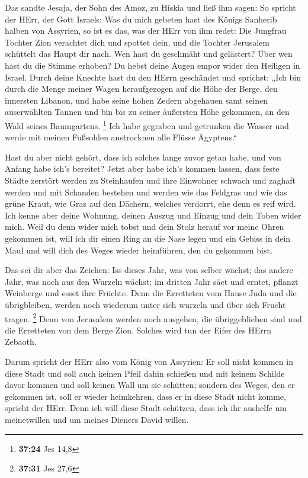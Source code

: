  Das sandte Jesaja, der Sohn des Amoz, zu Hiskia und ließ
ihm sagen: So spricht der HErr, der Gott Israels: Was du mich gebeten
hast des Königs Sanherib halben von Assyrien,  so ist es
das, was der HErr von ihm redet: Die Jungfrau Tochter Zion verachtet
dich und spottet dein, und die Tochter Jerusalem schüttelt das Haupt dir
nach.  Wen hast du geschmäht und gelästert? Über wen hast
du die Stimme erhoben? Du hebst deine Augen empor wider den Heiligen in
Israel.  Durch deine Knechte hast du den HErrn geschändet
und sprichst: „Ich bin durch die Menge meiner Wagen heraufgezogen auf
die Höhe der Berge, den innersten Libanon, und habe seine hohen Zedern
abgehauen samt seinen auserwählten Tannen und bin bis zu seiner
äußersten Höhe gekommen, an den Wald seines Baumgartens. \footnote{\textbf{37:24}
  Jes 14,8}  Ich habe gegraben und getrunken die Wasser und
werde mit meinen Fußsohlen austrocknen alle Flüsse Ägyptens.``

 Hast du aber nicht gehört, dass ich solches lange zuvor
getan habe, und von Anfang habe ich's bereitet? Jetzt aber habe ich's
kommen lassen, dass feste Städte zerstört werden zu Steinhaufen
 und ihre Einwohner schwach und zaghaft werden und mit
Schanden bestehen und werden wie das Feldgras und wie das grüne Kraut,
wie Gras auf den Dächern, welches verdorrt, ehe denn es reif wird.
 Ich kenne aber deine Wohnung, deinen Auszug und Einzug und
dein Toben wider mich.  Weil du denn wider mich tobst und
dein Stolz herauf vor meine Ohren gekommen ist, will ich dir einen Ring
an die Nase legen und ein Gebiss in dein Maul und will dich des Weges
wieder heimführen, den du gekommen bist.

 Das sei dir aber das Zeichen: Iss dieses Jahr, was von
selber wächst; das andere Jahr, was noch aus den Wurzeln wächst; im
dritten Jahr säet und erntet, pflanzt Weinberge und esset ihre Früchte.
 Denn die Erretteten vom Hause Juda und die übrigbleiben,
werden noch wiederum unter sich wurzeln und über sich Frucht tragen.
\footnote{\textbf{37:31} Jes 27,6}  Denn von Jerusalem
werden noch ausgehen, die übriggeblieben sind und die Erretteten von dem
Berge Zion. Solches wird tun der Eifer des HErrn Zebaoth.

 Darum spricht der HErr also vom König von Assyrien: Er
soll nicht kommen in diese Stadt und soll auch keinen Pfeil dahin
schießen und mit keinem Schilde davor kommen und soll keinen Wall um sie
schütten;  sondern des Weges, den er gekommen ist, soll er
wieder heimkehren, dass er in diese Stadt nicht komme, spricht der HErr.
 Denn ich will diese Stadt schützen, dass ich ihr aushelfe
um meinetwillen und um meines Dieners David willen.

